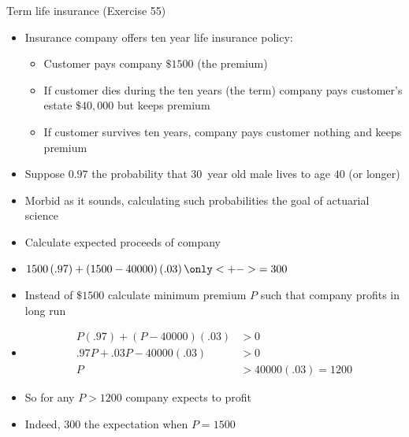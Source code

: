 \documentclass[handout]{beamer}
\theoremstyle{definition}
\begin{document}
\begin{frame}{Term life insurance (Exercise 55)}
\begin{itemize}
\item Insurance company offers \alert{ten year life
insurance policy}:
\begin{itemize}
\item Customer pays company $\$1500$ (the \alert{premium})
\item If customer dies during the ten years
(the \alert{term}) company pays customer's estate
$\$40,000$ but keeps premium
\item If customer survives ten years, company pays customer
nothing and keeps premium
\end{itemize}
\item Suppose $0.97$ the
probability that 30~year old male lives to age $40$ (or longer)
\item Morbid as it sounds, calculating such probabilities
the goal of \alert{actuarial science}
\item Calculate expected proceeds of company
\end{itemize}
\end{frame}

\begin{frame}
\begin{itemize}
\item $1500\left(.97\right)+\left(1500-40000\right)\left(.03\right)
\only<+->{=300}$
\item Instead of $\$1500$ calculate \alert{minimum}
premium $P$ such that company profits in long run
\item[]
\begin{align*}
P\left(.97\right)+\left(P-40000\right)\left(.03\right)&>0\\
.97P+.03P-40000\left(.03\right)&>0\\
P&>40000\left(.03\right)=1200
\end{align*}
\item So for any $P>1200$ company expects to profit
\item Indeed, $300$ the expectation when $P=1500$
\end{itemize}
\end{frame}
\end{document}
